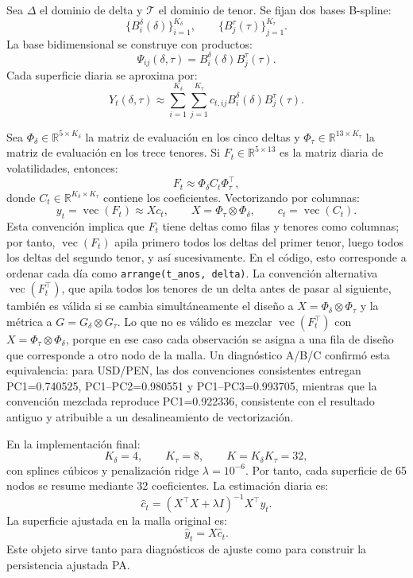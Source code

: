 \documentclass[a4paper,11pt]{article}
\newcommand{\R}{\mathbb{R}}
\begin{document}
Sea \(\Delta\) el dominio de delta y \(\mathcal{T}\) el dominio de tenor. Se fijan dos bases B-spline:
\[
  \{B_i^\delta(\delta)\}_{i=1}^{K_\delta},
  \qquad
  \{B_j^\tau(\tau)\}_{j=1}^{K_\tau}.
\]
La base bidimensional se construye con productos:
\[
  \Psi_{ij}(\delta,\tau)=B_i^\delta(\delta)B_j^\tau(\tau).
\]
Cada superficie diaria se aproxima por:
\[
  Y_t(\delta,\tau)
  \approx
  \sum_{i=1}^{K_\delta}\sum_{j=1}^{K_\tau}
  c_{t,ij}B_i^\delta(\delta)B_j^\tau(\tau).
\]

Sea \(\Phi_\delta\in\R^{5\times K_\delta}\) la matriz de evaluación en los cinco deltas y \(\Phi_\tau\in\R^{13\times K_\tau}\) la matriz de evaluación en los trece tenores. Si \(F_t\in\R^{5\times 13}\) es la matriz diaria de volatilidades, entonces:
\[
  F_t\approx \Phi_\delta C_t\Phi_\tau^\top,
\]
donde \(C_t\in\R^{K_\delta\times K_\tau}\) contiene los coeficientes. Vectorizando por columnas:
\[
  y_t=\operatorname{vec}(F_t)\approx Xc_t,
  \qquad
  X=\Phi_\tau\otimes \Phi_\delta,
  \qquad
  c_t=\operatorname{vec}(C_t).
\]
Esta convención implica que \(F_t\) tiene deltas como filas y tenores como columnas; por tanto, \(\operatorname{vec}(F_t)\) apila primero todos los deltas del primer tenor, luego todos los deltas del segundo tenor, y así sucesivamente. En el código, esto corresponde a ordenar cada día como \texttt{arrange(t\_anos, delta)}. La convención alternativa \(\operatorname{vec}(F_t^\top)\), que apila todos los tenores de un delta antes de pasar al siguiente, también es válida si se cambia simultáneamente el diseño a \(X=\Phi_\delta\otimes\Phi_\tau\) y la métrica a \(G=G_\delta\otimes G_\tau\). Lo que no es válido es mezclar \(\operatorname{vec}(F_t^\top)\) con \(X=\Phi_\tau\otimes\Phi_\delta\), porque en ese caso cada observación se asigna a una fila de diseño que corresponde a otro nodo de la malla. Un diagnóstico A/B/C confirmó esta equivalencia: para USD/PEN, las dos convenciones consistentes entregan PC1=0.740525, PC1--PC2=0.980551 y PC1--PC3=0.993705, mientras que la convención mezclada reproduce PC1=0.922336, consistente con el resultado antiguo y atribuible a un desalineamiento de vectorización.

En la implementación final:
\[
  K_\delta=4,\qquad K_\tau=8,\qquad K=K_\delta K_\tau=32,
\]
con splines cúbicos y penalización ridge \(\lambda=10^{-6}\). Por tanto, cada superficie de 65 nodos se resume mediante 32 coeficientes. La estimación diaria es:
\[
  \widehat c_t=(X^\top X+\lambda I)^{-1}X^\top y_t.
\]
La superficie ajustada en la malla original es:
\[
  \widehat y_t=X\widehat c_t.
\]
Este objeto sirve tanto para diagnósticos de ajuste como para construir la persistencia ajustada PA.
\end{document}
